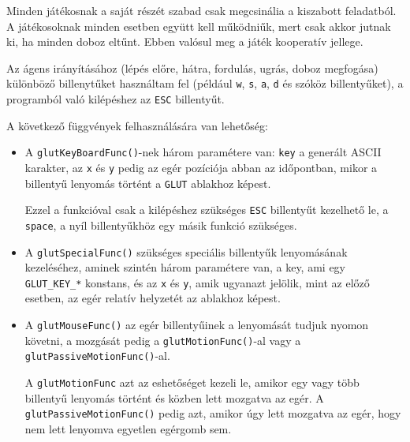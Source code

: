 Minden játékosnak a saját részét szabad csak megcsinália a kiszabott feladatból. 
A játékosoknak minden esetben együtt kell működniűk, mert csak akkor jutnak ki, ha minden doboz eltűnt. Ebben valósul meg a játék kooperatív jellege. 



Az ágens irányításához (lépés előre, hátra, fordulás, ugrás, doboz megfogása) különböző billenytűket használtam fel (például \texttt{w}, \texttt{s}, \texttt{a}, \texttt{d} és szóköz billentyűket), a  programból való kilépéshez az \texttt{ESC} billentyűt. 

A következő függvények felhasználására van lehetőség:
\begin{itemize}
\item A \texttt{glutKeyBoardFunc()}-nek három paramétere van: \texttt{key} a generált ASCII karakter, az \texttt{x} és \texttt{y} pedig az egér pozíciója abban az időpontban, mikor a billentyű lenyomás történt a \texttt{GLUT} ablakhoz képest.

Ezzel a funkcióval csak a kilépéshez szükséges \texttt{ESC} billentyűt kezelhető le, a \texttt{space}, a nyíl billentyűkhöz egy másik funkció szükséges.
\item A \texttt{glutSpecialFunc()} szükséges speciális billentyűk lenyomásának kezeléséhez,  
aminek szintén három paramétere van, a key, ami egy \texttt{GLUT\_KEY\_*} konstans, és az \texttt{x} és \texttt{y}, amik ugyanazt jelölik, mint az előző esetben, az egér relatív helyzetét az ablakhoz képest.
\item A \texttt{glutMouseFunc()} az egér billentyűinek a lenyomását tudjuk nyomon követni, a mozgását pedig a \texttt{glutMotionFunc()}-al vagy a \texttt{glutPassiveMotionFunc()}-al. 

A \texttt{glutMotionFunc} azt az eshetőséget kezeli le, amikor egy vagy több billentyű lenyomás történt és közben lett mozgatva az egér. A \texttt{glutPassiveMotionFunc()} pedig azt, amikor úgy lett mozgatva az egér, hogy nem lett lenyomva egyetlen egérgomb sem.
\end{itemize}


